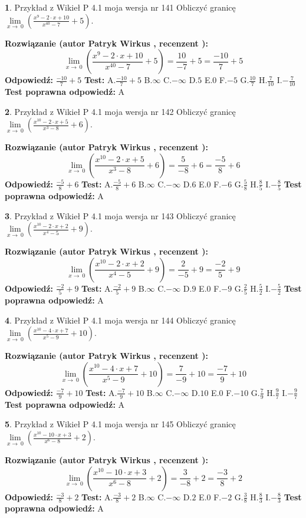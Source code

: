 \documentclass[12pt, a4paper]{article}
\theoremstyle{definition} %
\newtheorem{zad}{}
\newcommand{\zadStart}[1]{\begin{zad}#1\newline}
\newcommand{\zadStop}{\end{zad}}
\newcommand{\rozwStart}[2]{\noindent \textbf{Rozwiązanie (autor #1 , recenzent #2): }\newline}
\newcommand{\rozwStop}{\newline}
\newcommand{\odpStart}{\noindent \textbf{Odpowiedź:}\newline}
\newcommand{\odpStop}{\newline}
\newcommand{\testStart}{\noindent \textbf{Test:}\newline}
\newcommand{\testStop}{\newline}
\newcommand{\kluczStart}{\noindent \textbf{Test poprawna odpowiedź:}\newline}
\newcommand{\kluczStop}{\newline}
\begin{document}
\zadStart{Przykład z Wikieł P 4.1 moja wersja nr 141}
Obliczyć granicę $\lim\limits_{x\to\ 0}(\frac{x^{9}-2 \cdot x +10}{x^{40}-7}+5)$.
\zadStop
\rozwStart{Patryk Wirkus}{}
$$\lim\limits_{x\to\ 0}(\frac{x^{9}-2 \cdot x +10}{x^{40}-7}+5)=\frac{10}{-7}+5=\frac{-10}{7}+5$$
\rozwStop
\odpStart
$\frac{-10}{7}+5$
\odpStop
\testStart
A.$\frac{-10}{7}+5$
B.$\infty$
C.$-\infty$
D.$5$
E.$0$
F.$-5$
G.$\frac{10}{7}$
H.$\frac{7}{10}$
I.$-\frac{7}{10}$
\testStop
\kluczStart
A
\kluczStop



\zadStart{Przykład z Wikieł P 4.1 moja wersja nr 142}
Obliczyć granicę $\lim\limits_{x\to\ 0}(\frac{x^{10}-2 \cdot x +5}{x^{3}-8}+6)$.
\zadStop
\rozwStart{Patryk Wirkus}{}
$$\lim\limits_{x\to\ 0}(\frac{x^{10}-2 \cdot x +5}{x^{3}-8}+6)=\frac{5}{-8}+6=\frac{-5}{8}+6$$
\rozwStop
\odpStart
$\frac{-5}{8}+6$
\odpStop
\testStart
A.$\frac{-5}{8}+6$
B.$\infty$
C.$-\infty$
D.$6$
E.$0$
F.$-6$
G.$\frac{5}{8}$
H.$\frac{8}{5}$
I.$-\frac{8}{5}$
\testStop
\kluczStart
A
\kluczStop



\zadStart{Przykład z Wikieł P 4.1 moja wersja nr 143}
Obliczyć granicę $\lim\limits_{x\to\ 0}(\frac{x^{10}-2 \cdot x +2}{x^{4}-5}+9)$.
\zadStop
\rozwStart{Patryk Wirkus}{}
$$\lim\limits_{x\to\ 0}(\frac{x^{10}-2 \cdot x +2}{x^{4}-5}+9)=\frac{2}{-5}+9=\frac{-2}{5}+9$$
\rozwStop
\odpStart
$\frac{-2}{5}+9$
\odpStop
\testStart
A.$\frac{-2}{5}+9$
B.$\infty$
C.$-\infty$
D.$9$
E.$0$
F.$-9$
G.$\frac{2}{5}$
H.$\frac{5}{2}$
I.$-\frac{5}{2}$
\testStop
\kluczStart
A
\kluczStop



\zadStart{Przykład z Wikieł P 4.1 moja wersja nr 144}
Obliczyć granicę $\lim\limits_{x\to\ 0}(\frac{x^{10}-4 \cdot x +7}{x^{5}-9}+10)$.
\zadStop
\rozwStart{Patryk Wirkus}{}
$$\lim\limits_{x\to\ 0}(\frac{x^{10}-4 \cdot x +7}{x^{5}-9}+10)=\frac{7}{-9}+10=\frac{-7}{9}+10$$
\rozwStop
\odpStart
$\frac{-7}{9}+10$
\odpStop
\testStart
A.$\frac{-7}{9}+10$
B.$\infty$
C.$-\infty$
D.$10$
E.$0$
F.$-10$
G.$\frac{7}{9}$
H.$\frac{9}{7}$
I.$-\frac{9}{7}$
\testStop
\kluczStart
A
\kluczStop



\zadStart{Przykład z Wikieł P 4.1 moja wersja nr 145}
Obliczyć granicę $\lim\limits_{x\to\ 0}(\frac{x^{10}-10 \cdot x +3}{x^{6}-8}+2)$.
\zadStop
\rozwStart{Patryk Wirkus}{}
$$\lim\limits_{x\to\ 0}(\frac{x^{10}-10 \cdot x +3}{x^{6}-8}+2)=\frac{3}{-8}+2=\frac{-3}{8}+2$$
\rozwStop
\odpStart
$\frac{-3}{8}+2$
\odpStop
\testStart
A.$\frac{-3}{8}+2$
B.$\infty$
C.$-\infty$
D.$2$
E.$0$
F.$-2$
G.$\frac{3}{8}$
H.$\frac{8}{3}$
I.$-\frac{8}{3}$
\testStop
\kluczStart
A
\kluczStop
\end{document}
